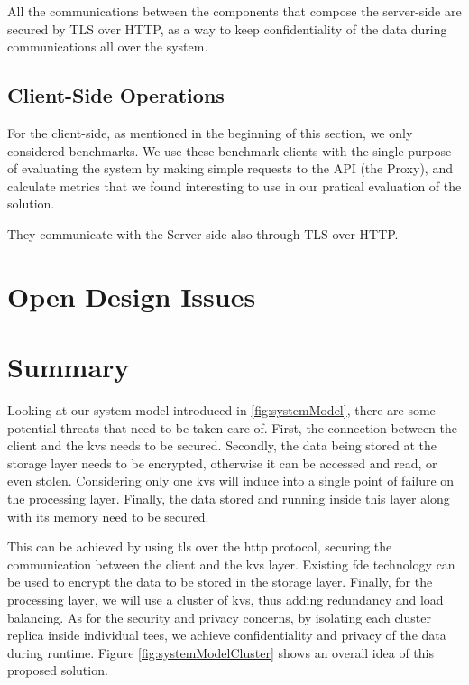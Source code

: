 All the communications between the components that compose the server-side are secured by TLS over HTTP, as a way to keep confidentiality of the data during communications all over the system.

\subsection{Client-Side Operations}

For the client-side, as mentioned in the beginning of this section, we only considered benchmarks. We use these benchmark clients with the single purpose of evaluating the system by making simple requests to the API (the Proxy), and calculate metrics that we found interesting to use in our pratical evaluation of the solution. 

They communicate with the Server-side also through TLS over HTTP.

\section{Open Design Issues} %

\section{Summary} %

Looking at our system model introduced in \ref{fig:systemModel}, there are some potential threats that need to be taken care of. First, the connection between the client and the \gls{kvs} needs to be secured. Secondly, the data being stored at the storage layer needs to be encrypted, otherwise it can be accessed and read, or even stolen. Considering only one \gls{kvs} will induce into a single point of failure on the processing layer. Finally, the data stored and running inside this layer along with its memory need to be secured. 

This can be achieved by using \gls{tls} over the \gls{http} protocol, securing the communication between the client and the \gls{kvs} layer.  Existing \gls{fde} technology can be used to encrypt the data to be stored in the storage layer. Finally, for the processing layer, we will use a cluster of \gls{kvs}, thus adding redundancy and load balancing. As for the security and privacy concerns, by isolating each cluster replica inside individual \gls{tee}s, we achieve confidentiality and privacy of the data during runtime. Figure \ref{fig:systemModelCluster} shows an overall idea of this proposed solution.

